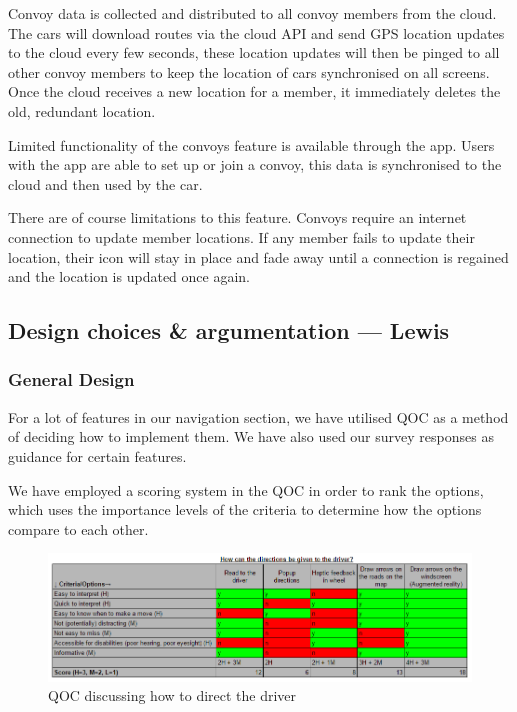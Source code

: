 \documentclass{article}
\begin{document}
Convoy data is collected and distributed to all convoy members from the cloud. The cars will download routes via the cloud API and send GPS location updates to the cloud every few seconds, these location updates will then be pinged to all other convoy members to keep the location of cars synchronised on all screens. Once the cloud receives a new location for a member, it immediately deletes the old, redundant location.

Limited functionality of the convoys feature is available through the app. Users with the app are able to set up or join a convoy, this data is synchronised to the cloud and then used by the car.

There are of course limitations to this feature. Convoys require an internet connection to update member locations. If any member fails to update their location, their icon will stay in place and fade away until a connection is regained and the location is updated once again.

\subsection{Design choices \& argumentation --- Lewis}\label{ssec:nav-design}
\subsubsection{General Design}\label{sssec:nav-design-general}
For a lot of features in our navigation section, we have utilised QOC as a method of deciding how to implement them. We have also used our survey responses as guidance for certain features.

We have employed a scoring system in the QOC in order to rank the options, which uses the importance levels of the criteria to determine how the options compare to each other.

\begin{figure}[H]
  \centering
  \includegraphics[scale=0.5]{qoc-nav-instruction}
  \caption{QOC discussing how to direct the driver}\label{qoc-instructions}
\end{figure}
\end{document}
